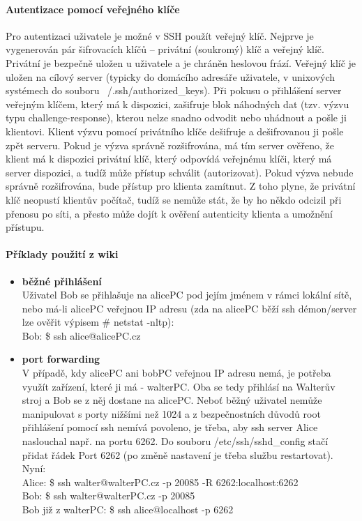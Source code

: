 \documentclass[10pt,a4paper]{article}
\begin{document}
\paragraph{Autentizace pomocí veřejného klíče} Pro autentizaci uživatele je možné v SSH použít veřejný klíč. Nejprve je vygenerován pár šifrovacích klíčů – privátní (soukromý) klíč a veřejný klíč. Privátní je bezpečně uložen u uživatele a je chráněn heslovou frází. Veřejný klíč je uložen na cílový server (typicky do domácího adresáře uživatele, v unixových systémech do souboru ~/.ssh/authorized\_keys). Při pokusu o přihlášení server veřejným klíčem, který má k dispozici, zašifruje blok náhodných dat (tzv. výzvu typu challenge-response), kterou nelze snadno odvodit nebo uhádnout a pošle ji klientovi. Klient výzvu pomocí privátního klíče dešifruje a dešifrovanou ji pošle zpět serveru. Pokud je výzva správně rozšifrována, má tím server ověřeno, že klient má k dispozici privátní klíč, který odpovídá veřejnému klíči, který má server dispozici, a tudíž může přístup schválit (autorizovat). Pokud výzva nebude správně rozšifrována, bude přístup pro klienta zamítnut. Z toho plyne, že privátní klíč neopustí klientův počítač, tudíž se nemůže stát, že by ho někdo odcizil při přenosu po síti, a přesto může dojít k ověření autenticity klienta a umožnění přístupu.
\paragraph{Příklady použití z wiki}
\begin{itemize}
	\item \textbf{běžné přihlášení} \\
	Uživatel Bob se přihlašuje na alicePC pod jejím jménem v rámci lokální sítě, nebo má-li alicePC veřejnou IP adresu (zda na alicePC běží ssh démon/server lze ověřit výpisem \# netstat -nltp): \\
	Bob: \$ ssh alice@alicePC.cz
	\item \textbf{port forwarding} \\
	V případě, kdy alicePC ani bobPC veřejnou IP adresu nemá, je potřeba využít zařízení, které ji má - walterPC. Oba se tedy přihlásí na Walterův stroj a Bob se z něj dostane na alicePC. Neboť běžný uživatel nemůže manipulovat s porty nižšími než 1024 a z bezpečnostních důvodů root přihlášení pomocí ssh nemívá povoleno, je třeba, aby ssh server Alice naslouchal např. na portu 6262. Do souboru /etc/ssh/sshd\_config stačí přidat řádek Port 6262 (po změně nastavení je třeba službu restartovat). Nyní:\\
	Alice: \$ ssh walter@walterPC.cz -p 20085 -R 6262:localhost:6262 \\
	Bob: \$ ssh walter@walterPC.cz -p 20085 \\
	Bob již z walterPC: \$ ssh alice@localhost -p 6262
\end{itemize}
\end{document}
